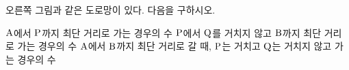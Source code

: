 \noindent\begin{minipage}[t]{0.58\linewidth}\vspace{0pt}\raggedright 오른쪽 그림과 같은 도로망이 있다. 다음을 구하시오.\end{minipage}\hfill\begin{minipage}[t]{0.4\linewidth}\vspace{0pt}\centering \resizebox{\ifdim\width>\linewidth\linewidth\else\width\fi}{!}{}\end{minipage}\par
{} $\mathrm{A}$에서 $\mathrm{P}$까지 최단 거리로 가는 경우의 수
 $\mathrm{P}$에서 $\mathrm{Q}$를 거치지 않고 $\mathrm{B}$까지 최단 거리로 가는 경우의 수
 $\mathrm{A}$에서 $\mathrm{B}$까지 최단 거리로 갈 때, $\mathrm{P}$는 거치고 $\mathrm{Q}$는 거치지 않고 가는 경우의 수
